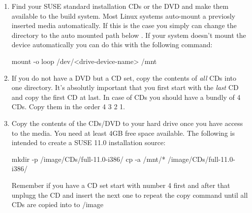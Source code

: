 \begin{enumerate}
\item Find your SUSE standard installation CDs or the DVD and
      make them available to the build system. Most Linux systems
      auto-mount a previosly inserted media automatically. If this
      is the case you simply can change the directory to the
      auto mounted path below . If your system doesn't mount
      the device automatically you can do this with the following
      command:

\begin{Command}{12cm}
mount -o loop /dev/<drive-device-name> /mnt
\end{Command}

\item If you do not have a DVD but a CD set, copy the contents of
      \emph{all} CDs into one directory. It's
      absolutly important that you first start with the \emph{last} CD and
      copy the first CD at last. In case of CDs you should have a
      bundly of 4 CDs. Copy them in the order 4 3 2 1.

\item Copy the contents of the CDs/DVD to your hard drive once you have 
      access to the media. You need at least 4GB free
      space available. The following is intended to create a SUSE
      11.0 installation source:

\begin{Command}{12cm}
mkdir -p /image/CDs/full-11.0-i386/
cp -a /mnt/* /image/CDs/full-11.0-i386/
\end{Command}

      Remember if you have a CD set start with number 4 first and
      after that unplugg the CD and insert the next one to repeat
      the copy command until all CDs are copied into to /image
\end{enumerate}

